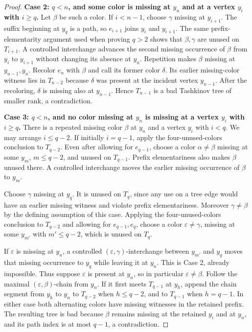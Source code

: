 \begin{proof}
\textbf{Case 2: $q<n$, and some color is missing at $y_n$ and at a vertex
$y_i$ with $i\geq q$.}
Let $\beta$ be such a color.  If $i<n-1$, choose $\gamma$ missing at
$y_{i+1}$.  The suffix beginning at $y_q$ is a path, so $e_{i+1}$ joins
$y_i$ and $y_{i+1}$.  The same prefix-elementarity argument used when
proving $q>2$ shows that $\beta,\gamma$ are unused on $T_{i+1}$.  A
controlled interchange advances the second missing occurrence of $\beta$
from $y_i$ to $y_{i+1}$ without changing its absence at $y_n$.  Repetition
makes $\beta$ missing at $y_{n-1},y_n$.  Recolor $e_n$ with $\beta$ and
call its former color $\delta$.  Its earlier missing-color witness lies in
$T_{n-2}$ because $\delta$ was present at the incident vertex $y_{n-1}$.
After the recoloring, $\delta$ is missing also at $y_{n-1}$.  Hence
$T_{n-1}$ is a bad Tashkinov tree of smaller rank, a contradiction.

\textbf{Case 3: $q<n$, and no color missing at $y_n$ is missing at a
vertex $y_i$ with $i\geq q$.}
There is a repeated missing color $\beta$ at $y_n$ and a vertex $y_i$ with
$i<q$.  We may arrange $i\leq q-2$.  If initially $i=q-1$, apply the
four-unused-colors conclusion to $T_{q-2}$.  Even after allowing for
$e_{q-1}$, choose a color $\alpha\ne\beta$ missing at some
$y_m$, $m\leq q-2$, and unused on $T_{q-1}$.  Prefix elementariness also
makes $\beta$ unused there.  A controlled interchange moves the earlier
missing occurrence of $\beta$ to $y_m$.

Choose $\gamma$ missing at $y_q$.  It is unused on $T_q$, since any use on
a tree edge would have an earlier missing witness and violate prefix
elementariness.  Moreover $\gamma\ne\beta$ by the defining assumption of
this case.  Applying the four-unused-colors conclusion to $T_{q-2}$ and
allowing for $e_{q-1},e_q$, choose a color $\varepsilon\ne\gamma$, missing
at some $y_{m'}$ with $m'\leq q-2$, which is unused on $T_q$.

If $\varepsilon$ is missing at $y_n$, a controlled
$(\varepsilon,\gamma)$-interchange between $y_{m'}$ and $y_q$ moves that
missing occurrence to $y_q$ while leaving it at $y_n$.  This is Case 2,
already impossible.  Thus suppose $\varepsilon$ is present at $y_n$, so in
particular $\varepsilon\ne\beta$.  Follow the maximal
$(\varepsilon,\beta)$-chain from $y_n$.  If it first meets $T_{q-1}$ at
$y_h$, append the chain segment from $y_h$ to $y_n$ to $T_{q-2}$ when
$h\leq q-2$, and to $T_{q-1}$ when $h=q-1$.  In either case both alternating
colors have missing witnesses in the retained prefix.  The resulting tree
is bad because $\beta$ remains missing at the retained $y_i$ and at $y_n$,
and its path index is at most $q-1$, a contradiction.


\end{proof}
